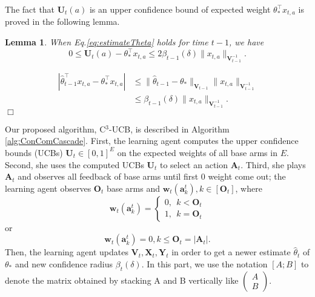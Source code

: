 \documentclass{article}
\newcommand{\bA}{\mathbf{A}}
\newcommand{\ba}{\mathbf{a}}
\newcommand{\bO}{\mathbf{O}}
\newcommand{\bU}{\mathbf{U}}
\newcommand{\bV}{\mathbf{V}}
\newcommand{\bw}{\mathbf{w}}
\newcommand{\bX}{\mathbf{X}}
\newcommand{\bY}{\mathbf{Y}}
\newcommand{\abs}[1]{\left| #1 \right|}
\newcommand{\norm}[1]{\| #1 \|}
\newtheorem{lemma}[theorem]{Lemma}%
\newenvironment{proof}{\noindent {\textbf{Proof. }}}{$\Box$ \medskip}
\begin{document}
The fact that $\bU_t(a)$ is an upper confidence bound of expected weight $\theta_*^{\top}x_{t,a}$ is proved in the following lemma.
\begin{lemma}
\label{lem:estimateU}
When Eq.\eqref{eq:estimateTheta} holds for time $t-1$, we have
$$
0 \leq \bU_t(a) - \theta_{\ast}^{\top}x_{t,a} \leq 2\beta_{t-1}(\delta)\norm{x_{t,a}}_{\bV_{t-1}^{-1}}.
$$
\end{lemma}
\begin{proof}
\begin{align*}
\abs{\hat{\theta}_{t-1}^{\top}x_{t,a} - \theta_{\ast}^{\top}x_{t,a}} &\leq \norm{\hat{\theta}_{t-1} - \theta_{\ast}}_{\bV_{t-1}} \norm{x_{t,a}}_{\bV_{t-1}^{-1}} \\
&\leq \beta_{t-1}(\delta)\norm{x_{t,a}}_{\bV_{t-1}^{-1}}.
\end{align*}
\end{proof}

Our proposed algorithm, C$^3$-UCB, is described in Algorithm \ref{alg:ConComCascade}. 
First, the learning agent 
	computes the upper confidence bounds (UCBs) $\bU_t \in [0,1]^{E}$ on the expected weights of all base arms in $E$. 
Second, she uses the computed UCBs $\bU_t$ to select an action $\bA_t$. 
Third, she plays $\bA_t$ and observes all feedback of base arms until first $0$ weight come out; the learning agent observes $\bO_t$ base arms and $\bw_t(\ba_k^t), k \in [\bO_t]$, where 
$$
\bw_t(\ba_{k}^t) = \begin{cases} 0, ~~k < \bO_t\\ 1, ~~k = \bO_t\end{cases}
$$ 
or
$$
\bw_t(\ba_k^t) = 0, k \leq \bO_t = \abs{\bA_t}.
$$
Then, the learning agent updates $\bV_t, \bX_t, \bY_t$ in order to get a newer estimate $\hat{\theta}_t$ of $\theta_*$ and new confidence radius $\beta_t(\delta)$. In this part, we use the notation $[A; B]$ to denote the matrix obtained by stacking A and B vertically like
 $\begin{pmatrix} A\\ B\end{pmatrix}$.
\end{document}
